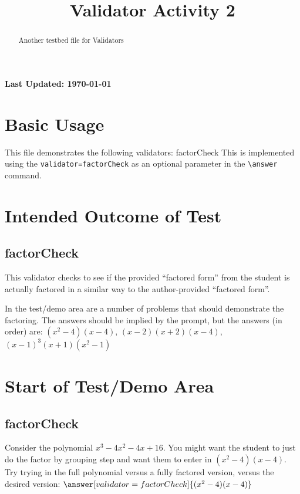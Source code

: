\documentclass{ximera}
\title{Validator Activity 2}
\begin{document}
\begin{abstract}
    Another testbed file for Validators
\end{abstract}
\maketitle

{{\Huge \bfseries Last Updated: \today}} \\

\section{Basic Usage}

This file demonstrates the following validators: factorCheck
This is implemented using the \verb|validator=factorCheck| as an optional parameter in the \verb|\answer| command.

\section{Intended Outcome of Test}
    \subsection*{factorCheck}
        This validator checks to see if the provided ``factored form'' from the student 
        is actually factored in a similar way to the author-provided ``factored form''.
        
        In the test/demo area are a number of problems that should demonstrate the factoring. The answers should be implied by the prompt, 
        but the answers (in order) are: $(x^2-4)(x-4)$, $(x-2)(x+2)(x-4)$, $(x-1)^3(x+1)(x^2-1)$

\section{Start of Test/Demo Area}

    \subsection*{factorCheck}
        \begin{problem}
            Consider the polynomial $x^3 - 4x^2 - 4x + 16$. You might want the student to just do the factor by grouping step 
            and want them to enter in $(x^2-4)(x-4)$. 
            Try trying in the full polynomial versus a fully factored version, 
            versus the desired version: $\answer[validator=factorCheck]{(x^2-4)(x-4)}$
        \end{problem}
\end{document}
